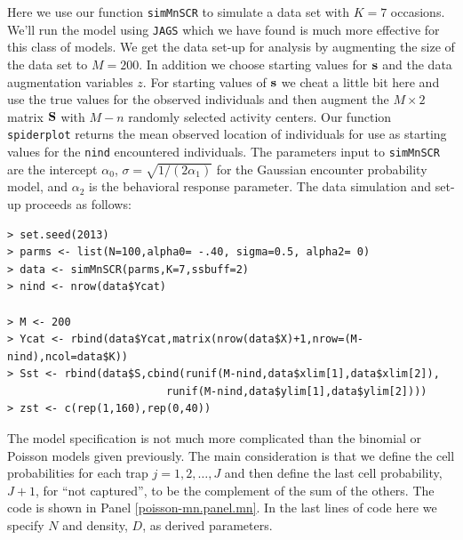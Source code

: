 Here we use our function \mbox{\tt simMnSCR} to simulate a data set
with $K=7$ occasions.
We'll run the model using \mbox{\tt JAGS}
which we have found is much more effective for this class of models.
We get the data set-up for analysis by augmenting the size of the data
set to $M=200$. In addition we choose starting values for ${\bf s}$
and the data augmentation variables $z$.  For starting values of ${\bf
  s}$ we cheat a little bit here and use the true values for the
observed individuals and then augment the $M \times 2$ matrix ${\bf
  S}$ with $M-n$ randomly selected activity centers. Our function
\mbox{\tt spiderplot} returns the mean observed location of
individuals for use as starting values for the \mbox{\tt nind}
encountered individuals.  The parameters input to
\mbox{\tt simMnSCR} are the intercept $\alpha_{0}$, $\sigma =
\sqrt{1/(2\alpha_{1})}$ for the Gaussian encounter probability model,
and $\alpha_{2}$ is the behavioral response parameter. The data
simulation and set-up proceeds as follows:
{\small
\begin{verbatim}
> set.seed(2013)
> parms <- list(N=100,alpha0= -.40, sigma=0.5, alpha2= 0)
> data <- simMnSCR(parms,K=7,ssbuff=2)
> nind <- nrow(data$Ycat)

> M <- 200
> Ycat <- rbind(data$Ycat,matrix(nrow(data$X)+1,nrow=(M-nind),ncol=data$K))
> Sst <- rbind(data$S,cbind(runif(M-nind,data$xlim[1],data$xlim[2]),
                         runif(M-nind,data$ylim[1],data$ylim[2])))
> zst <- c(rep(1,160),rep(0,40))
\end{verbatim}
}


The model specification is not much more complicated than the binomial
or Poisson models given previously. The main consideration is that we
define the cell probabilities for each trap $j=1,2,\dots,J$ and then
define the last cell probability, $J+1$, for ``not captured'', to be
the complement of the sum of the others. The code is shown in Panel
\ref{poisson-mn.panel.mn}.  In the last lines of code here we specify
$N$ and density, $D$, as derived parameters.

